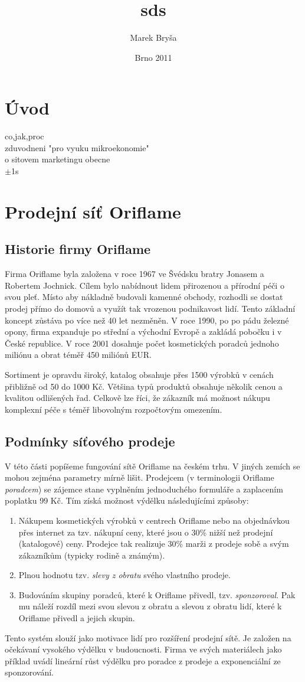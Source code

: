\documentclass[a4wide,12pt]{report}
\title{sds}
\author{Marek Bryša}
\date{Brno 2011}
\begin{document}
\tableofcontents

\chapter*{Úvod}
co,jak,proc\\
zduvodneni "pro vyuku mikroekonomie"\\
o sitovem marketingu obecne\\
$\pm$1s
\chapter{Prodejní síť Oriflame}
\section{Historie firmy Oriflame}
Firma Oriflame byla založena v roce 1967 ve Švédsku bratry Jonasem a Robertem Jochnick. Cílem bylo nabídnout lidem přirozenou a přírodní péči o svou pleť. Místo aby nákladně budovali kamenné obchody, rozhodli se dostat prodej přímo do domovů a využít tak vrozenou podnikavost lidí. Tento základní koncept zůstáva po více než 40 let nezměněn. V roce 1990, po po pádu železné opony, firma expanduje po střední a východní Evropě a zakládá pobočku i v České republice. V roce 2001 dosahuje počet kosmetických poradců jednoho miliónu a obrat téměř 450 miliónů EUR.

Sortiment je opravdu široký, katalog obsahuje přes 1500 výrobků v cenách přibližně od 50 do 1000 Kč. Většina typů produktů obsahuje několik cenou a kvalitou odlišených řad. Celkově lze říci, že zákazník má možnost nákupu komplexní péče s téměř libovolným rozpočtovým omezením.
\section{Podmínky síťového prodeje}
V této části popíšeme fungování sítě Oriflame na českém trhu. V jiných zemích se mohou zejména parametry mírně lišit. Prodejcem (v terminologii Oriflame \emph{poradcem}) se zájemce stane vyplněním jednoduchého formuláře a zaplacením poplatku 99 Kč. Tím získá možnost výdělku následujícími způsoby:
\begin{enumerate}
\item Nákupem kosmetických výrobků v centrech Oriflame nebo na objednávkou přes internet za tzv. nákupní ceny, které jsou o 30\% nižší než prodejní (katalogové) ceny. Prodejce tak realizuje 30\% marži z prodeje sobě a svým zákazníkům (typicky rodině a známým).
\item Plnou hodnotu tzv. \emph{slevy z obratu} svého vlastního prodeje.
\item Budováním skupiny poradců, které k Oriflame přivedl, tzv. \emph{sponzoroval}. Pak mu náleží rozdíl mezi svou slevou z obratu a slevou z obratu lidí, které k Oriflame přivedl a jejich skupin.
\end{enumerate}
Tento systém slouží jako motivace lidí pro rozšíření prodejní sítě. Je založen na očekávaní vysokého výdělku v budoucnosti. Firma ve svých materiálech jako příklad uvádí lineární růst výdělku pro poradce z prodeje a exponenciální ze sponzorování.
\end{document}

